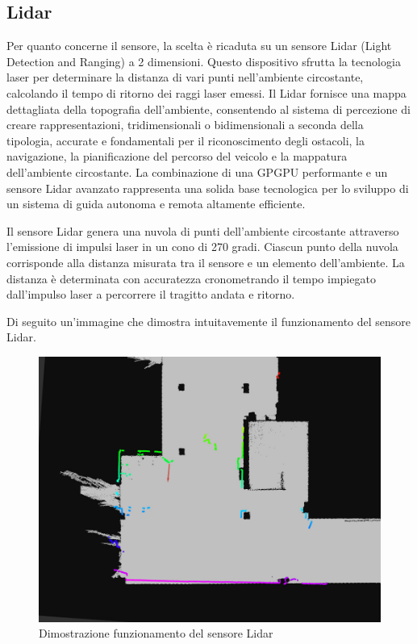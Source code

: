 \subsection{Lidar}
Per quanto concerne il sensore, la scelta è ricaduta su un sensore Lidar (Light Detection and Ranging) a 2 dimensioni. Questo dispositivo sfrutta la tecnologia laser per determinare la distanza di vari punti nell'ambiente circostante, calcolando il tempo di ritorno dei raggi laser emessi. Il Lidar fornisce una mappa dettagliata della topografia dell'ambiente, consentendo al sistema di percezione di creare rappresentazioni, tridimensionali o bidimensionali a seconda della tipologia, accurate e fondamentali per il riconoscimento degli ostacoli, la navigazione, la pianificazione del percorso del veicolo e la mappatura dell'ambiente circostante. La combinazione di una GPGPU performante e un sensore Lidar avanzato rappresenta una solida base tecnologica per lo sviluppo di un sistema di guida autonoma e remota altamente efficiente.

\noindent Il sensore Lidar genera una nuvola di punti dell'ambiente circostante attraverso l'emissione di impulsi laser in un cono di 270 gradi. Ciascun punto della nuvola corrisponde alla distanza misurata tra il sensore e un elemento dell'ambiente. La distanza è determinata con accuratezza cronometrando il tempo impiegato dall'impulso laser a percorrere il tragitto andata e ritorno.

\noindent Di seguito un'immagine che dimostra intuitavemente il funzionamento del sensore Lidar.

\begin{figure}[h!]
  \centering
  \includegraphics[width=1\textwidth]{figures/lidar_map.png}
  \caption{Dimostrazione funzionamento del sensore Lidar}
  \label{Dimostrazione funzionamento del sensore Lidar}
\end{figure}

